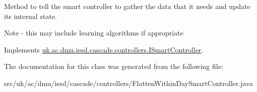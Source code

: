 Method to tell the smart controller to gather the data that it needs and update its internal state. 

Note -\/ this may include learning algorithms if appropriate 

Implements \hyperlink{interfaceuk_1_1ac_1_1dmu_1_1iesd_1_1cascade_1_1controllers_1_1_i_smart_controller_afc5d7e6516ec865dbb4e94d62b114440}{uk.\-ac.\-dmu.\-iesd.\-cascade.\-controllers.\-I\-Smart\-Controller}.



The documentation for this class was generated from the following file\-:\begin{DoxyCompactItemize}
\item 
src/uk/ac/dmu/iesd/cascade/controllers/Flatten\-Within\-Day\-Smart\-Controller.\-java\end{DoxyCompactItemize}

